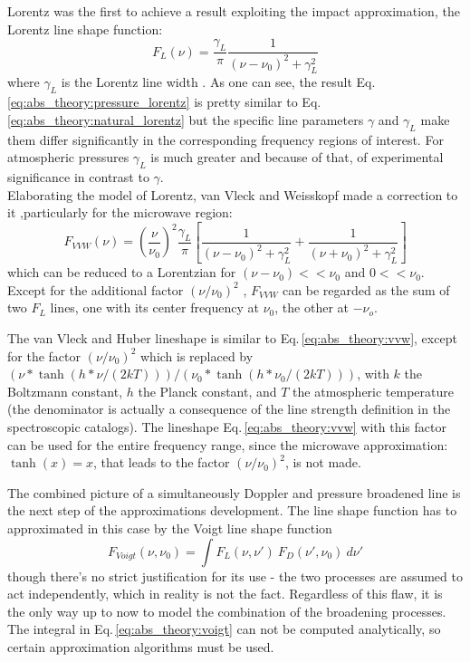Lorentz was the first to achieve a result exploiting the impact
approximation, the Lorentz line shape function:
\begin{equation}\label{eq:abs_theory:pressure_lorentz}
 F_L(\nu)=\frac{\gamma_L}{\pi}\frac{1}{(\nu-\nu_0)^2+\gamma_L^2}
\end{equation}
where $\gamma_L$ is the Lorentz line width \citep{thorne:99}. As one
can see, the result Eq.\,\ref{eq:abs_theory:pressure_lorentz} is pretty similar to
Eq.\,\ref{eq:abs_theory:natural_lorentz} but the specific line parameters $\gamma$
and $\gamma_L$ make them differ significantly in the corresponding
frequency regions of interest. For atmospheric pressures $\gamma_L$ is
much greater and because of that, of experimental
significance in contrast to $\gamma$.\\
Elaborating the model of Lorentz, van Vleck and Weisskopf made a
correction to it \citep{vanvleck:45},particularly for the microwave
region:
\begin{equation}\label{eq:abs_theory:vvw}
 F_{VVW} (\nu)=\left(\frac{\nu}{\nu_0}\right)^2\frac{\gamma_L}{\pi}
 \left[\frac{1}{(\nu-\nu_0)^2+\gamma_L^2}+\frac{1}{(\nu+\nu_0)^2+\gamma_L^2}\right]
\end{equation}
which can be reduced to a Lorentzian for $(\nu-\nu_0) << \nu_0$ and $0
<< \nu_0$. Except for the additional factor $(\nu/\nu_0)^2$ ,
$F_{VVW}$ can be regarded as the sum of two $F_L$
lines, one with its center frequency at $\nu_0$, the other at
$-\nu_o$.

The van Vleck and Huber lineshape \citep{vanvleckhuber:77} is similar
to Eq.\,\ref{eq:abs_theory:vvw}, except for the factor $(\nu/\nu_0)^2$ which is
replaced by $(\nu * \tanh(h*\nu/(2kT)))/(\nu_0 *
\tanh(h*\nu_0/(2kT)))$, with $k$ the Boltzmann constant, $h$ the Planck
constant, and $T$ the atmospheric temperature (the denominator is
actually a consequence of the line strength definition in the
spectroscopic catalogs). The lineshape Eq.\,\ref{eq:abs_theory:vvw} with this
factor can be used for the entire frequency range, since
the microwave approximation: $\tanh(x) = x$, that leads to the factor
$(\nu/\nu_0)^2$, is not made.

The combined picture of a simultaneously Doppler and pressure
broadened line is the next step of the approximations development. The
line shape function has to approximated in this case by the Voigt line shape
function 
\begin{equation}\label{eq:abs_theory:voigt}
 F_{Voigt}(\nu,\nu_0)= \int F_L(\nu,\nu')~F_D(\nu',\nu_0)~d\nu'
\end{equation}
though there's no strict justification for its use - the two processes
are assumed to act independently, which in reality is not the
fact. Regardless of this flaw, it is the only way up to now to model
the combination of the broadening processes. The integral in Eq.\,\ref{eq:abs_theory:voigt}
can not be computed analytically, so certain approximation algorithms
must be used.


